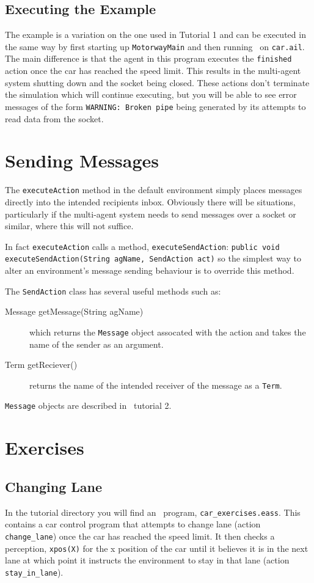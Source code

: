 \subsection{Executing the Example}
The example is a variation on the one used in Tutorial 1 and can be executed in the same way by first starting up \texttt{MotorwayMain} and then running \ail\ on \texttt{car.ail}.  The main difference is that the agent in this program executes the \lstinline{finished} action once the car has reached the speed limit.  This results in the multi-agent system shutting down and the socket being closed.  These actions don't terminate the simulation which will continue executing, but you will be able to see error messages of the form \texttt{WARNING: Broken pipe} being generated by its attempts to read data from the socket.

\section{Sending Messages}
The \texttt{executeAction} method in the default environment simply places messages directly into the intended recipients inbox.  Obviously there will be situations, particularly if the multi-agent system needs to send messages over a socket or similar, where this will not suffice.

In fact \texttt{executeAction} calls a method, \texttt{executeSendAction}: \texttt{public void executeSendAction(String agName, SendAction act)} so the simplest way to alter an environment's message sending behaviour is to override this method.

The \texttt{SendAction} class has several useful methods such as:
\begin{description}
\item[Message getMessage(String agName)] which returns the \texttt{Message} object assocated with the action and takes the name of the sender as an argument.
\item[Term getReciever()] returns the name of the intended receiver of the message as a \texttt{Term}.
\end{description}
\texttt{Message} objects are described in \ail\ tutorial 2.

\section{Exercises}
\subsection{Changing Lane}
In the tutorial directory you will find an \eass\ program, \texttt{car\_exercises.eass}.  This contains a car control program that attempts to change lane (action \lstinline{change_lane}) once the car has reached the speed limit.  It then checks a perception, \lstinline{xpos(X)} for the x position of the car until it believes it is in the next lane at which point it instructs the environment to stay in that lane (action \lstinline{stay_in_lane}). 

